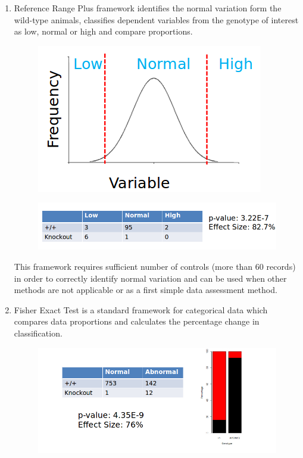 \documentclass[12pt,a4paper]{article}
\begin{document}
\begin{enumerate}
\item Reference Range Plus framework identifies the normal variation form the wild-type animals, classifies dependent variables from the genotype of interest as low, normal or high and compare proportions.  
\begin{figure}[!htpb]%
\centerline{\includegraphics[scale=0.4]{RR1_simple.png}}
\end{figure} 
\begin{figure}[!htpb]%
\centerline{\includegraphics[scale=0.4]{RR2_simple.png}}
\end{figure}

This framework requires sufficient number of controls (more than 60 records) in order to correctly identify normal variation and can be used when other methods are not applicable or as a first simple data assessment method. 
\item Fisher Exact Test is a standard framework for categorical data which compares data proportions and calculates the percentage change in classification.
\begin{figure}[!htpb]%
\centerline{\includegraphics[scale=0.4]{FE_simple.png}}
\end{figure}
\end{enumerate}
\end{document}

